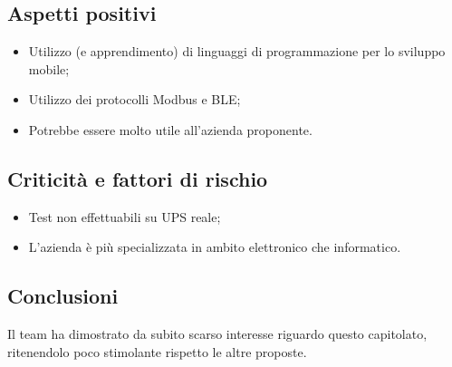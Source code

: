 	\subsection{Aspetti positivi}
		\begin{itemize}
			\item Utilizzo (e apprendimento) di linguaggi di programmazione per lo sviluppo mobile;
			\item Utilizzo dei protocolli Modbus e BLE;
			\item Potrebbe essere molto utile all'azienda proponente.
		\end{itemize}

	\subsection {Criticità e fattori di rischio}
		\begin{itemize}
			\item Test non effettuabili su UPS reale;
			\item L'azienda è più specializzata in ambito elettronico che informatico.
	\end{itemize}

\subsection {Conclusioni}
	Il team ha dimostrato da subito scarso interesse riguardo questo capitolato, ritenendolo poco stimolante rispetto le altre proposte.